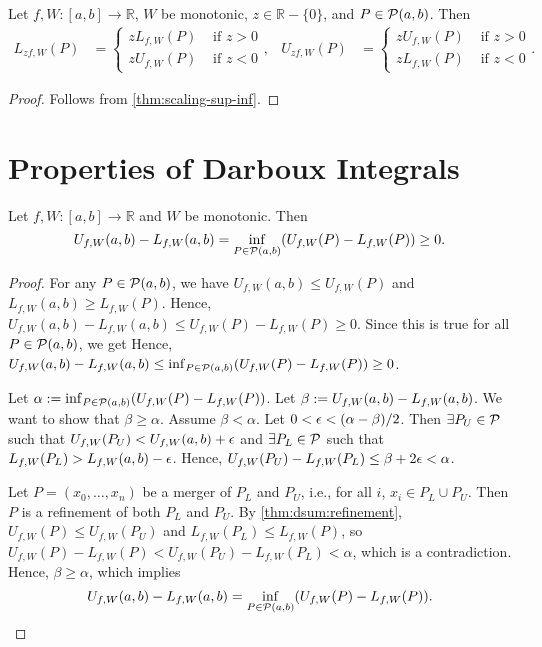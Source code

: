 \documentclass[a4paper,12pt,fleqn]{article}
\begin{document}
\begin{lemma}
\label{thm:dsum:scaling}
Let $f, W: [a, b] \to \mathbb{R}$, $W$ be monotonic,
$z \in \mathbb{R} - \{0\}$, and $P \in \mathcal{P}(a, b)$. Then
\begin{align*}
L_{zf,W}(P) &= \begin{cases}
    zL_{f,W}(P) & \text{ if } z > 0
    \\ zU_{f,W}(P) & \text{ if } z < 0
\end{cases},
& U_{zf,W}(P) &= \begin{cases}
    zU_{f,W}(P) & \text{ if } z > 0
    \\ zL_{f,W}(P) & \text{ if } z < 0
\end{cases}.
\end{align*}
\end{lemma}
\begin{proof}
Follows from \cref{thm:scaling-sup-inf}.
\end{proof}

\section{Properties of Darboux Integrals}

\begin{lemma}
\label{thm:dint:l-le-u}
Let $f, W: [a, b] \to \mathbb{R}$ and $W$ be monotonic. Then
\[ U_{f,W}(a, b) - L_{f,W}(a, b) = \inf_{P \in \mathcal{P}(a, b)} (U_{f,W}(P) - L_{f,W}(P)) \ge 0. \]
\end{lemma}
\begin{proof}
For any $P \in \mathcal{P}(a, b)$, we have $U_{f,W}(a, b) \le U_{f,W}(P)$
and $L_{f,W}(a, b) \ge L_{f,W}(P)$.
Hence, $U_{f,W}(a, b) - L_{f,W}(a, b) \le U_{f,W}(P) - L_{f,W}(P) \ge 0$.
Since this is true for all $P \in \mathcal{P}(a, b)$, we get
Hence, $U_{f,W}(a, b) - L_{f,W}(a, b) \le \inf_{P \in \mathcal{P}(a, b)} (U_{f,W}(P) - L_{f,W}(P)) \ge 0$.

Let $\alpha := \inf_{P \in \mathcal{P}(a, b)} (U_{f,W}(P) - L_{f,W}(P))$.
Let $\beta := U_{f,W}(a, b) - L_{f,W}(a, b)$.
We want to show that $\beta \ge \alpha$. Assume $\beta < \alpha$.
Let $0 < \epsilon < (\alpha - \beta) / 2$.
Then $\exists P_U \in \mathcal{P}$ such that $U_{f,W}(P_U) < U_{f,W}(a, b) + \epsilon$
and $\exists P_L \in \mathcal{P}$ such that $L_{f,W}(P_L) > L_{f,W}(a, b) - \epsilon$.
Hence, $U_{f,W}(P_U) - L_{f,W}(P_L) \le \beta + 2\epsilon < \alpha$.

Let $P = (x_0, \ldots, x_n)$ be a merger of $P_L$ and $P_U$,
i.e., for all $i$, $x_i \in P_L \cup P_U$.
Then $P$ is a refinement of both $P_L$ and $P_U$.
By \cref{thm:dsum:refinement}, $U_{f,W}(P) \le U_{f,W}(P_U)$ and $L_{f,W}(P_L) \le L_{f,W}(P)$,
so $U_{f,W}(P) - L_{f,W}(P) < U_{f,W}(P_U) - L_{f,W}(P_L) < \alpha$, which is a contradiction.
Hence, $\beta \ge \alpha$, which implies
\[ U_{f,W}(a, b) - L_{f,W}(a, b) = \inf_{P \in \mathcal{P}(a, b)} (U_{f,W}(P) - L_{f,W}(P)). \]
\end{proof}
\end{document}
